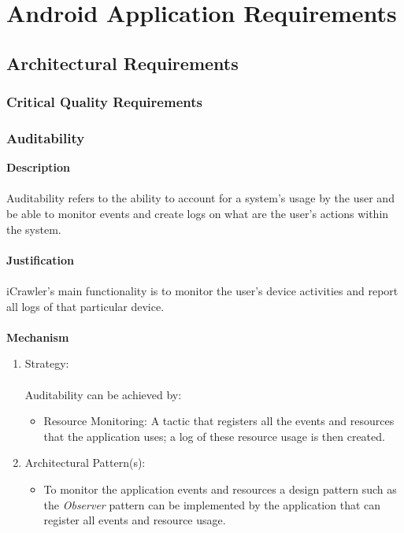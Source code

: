 
	\section{Android Application Requirements}
	\subsection{Architectural Requirements}
		\subsubsection{Critical Quality Requirements} 
			\subsubsection*{Auditability}
			\textbf{Description} \\\\
			Auditability refers to the ability to account for a system's usage by the user and be able to monitor events and create logs on what are the user's actions within the system.\\\\
			\textbf{Justification}\\\\
			iCrawler's main functionality is to monitor the user's device activities and report all logs of that particular device.\\\\
			\textbf{Mechanism}
				\begin{enumerate}
					\item Strategy: \\\\
						Auditability can be achieved by:
						\begin{itemize}
							\item Resource Monitoring: A tactic that registers all the events and resources that the application uses; a log of these resource usage is then created.  
						\end{itemize}
					\item Architectural Pattern(s):
						\begin{itemize}
							\item To monitor the application events and resources a design pattern such as the \emph{Observer} pattern can be implemented by the application that can register all events and resource usage. 
						\end{itemize}
				\end{enumerate}	
			\newpage
